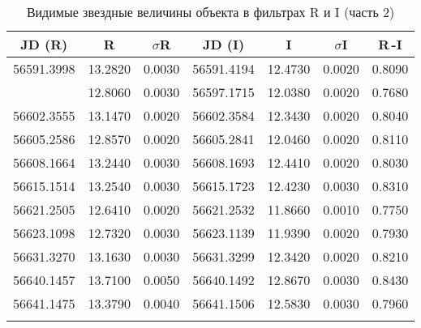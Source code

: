 \newpage

\begin{table}[h]
  \centering
  \caption{Видимые звездные величины объекта в фильтрах R и I (часть 2)}
  \begin{tabular}{ccccccc}
    \toprule
    JD (R) &
    R &
    $\sigma$R &
    JD (I) &
    I &
    $\sigma$I &
    R\,-I \\
    \midrule
    56591.3998 & 13.2820 & 0.0030 & 56591.4194 & 12.4730 & 0.0020 & 0.8090 \\
    \arrayrulecolor{black!40}
    \midrule
    56597.1685 & 12.8060 & 0.0030 & 56597.1715 & 12.0380 & 0.0020 & 0.7680 \\
    \midrule
    56602.3555 & 13.1470 & 0.0020 & 56602.3584 & 12.3430 & 0.0020 & 0.8040 \\
    \midrule
    56605.2586 & 12.8570 & 0.0020 & 56605.2841 & 12.0460 & 0.0020 & 0.8110 \\
    \midrule
    56608.1664 & 13.2440 & 0.0030 & 56608.1693 & 12.4410 & 0.0020 & 0.8030 \\
    \midrule
    56615.1514 & 13.2540 & 0.0030 & 56615.1723 & 12.4230 & 0.0030 & 0.8310 \\
    \midrule
    56621.2505 & 12.6410 & 0.0020 & 56621.2532 & 11.8660 & 0.0010 & 0.7750 \\
    \midrule
    56623.1098 & 12.7320 & 0.0030 & 56623.1139 & 11.9390 & 0.0020 & 0.7930 \\
    \midrule
    56631.3270 & 13.1630 & 0.0030 & 56631.3299 & 12.3420 & 0.0020 & 0.8210 \\
    \midrule
    56640.1457 & 13.7100 & 0.0050 & 56640.1492 & 12.8670 & 0.0030 & 0.8430 \\
    \midrule
    56641.1475 & 13.3790 & 0.0040 & 56641.1506 & 12.5830 & 0.0030 & 0.7960 \\
    \arrayrulecolor{black}
    \bottomrule
  \end{tabular}
\end{table}

